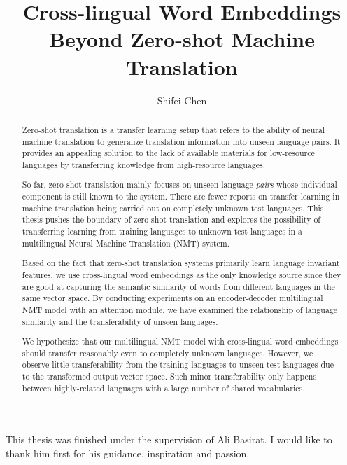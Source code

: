 \documentclass[thesis]{cluu}
\begin{document}
\author{Shifei Chen}
\title{Cross-lingual Word Embeddings Beyond Zero-shot Machine Translation}

\maketitle

\begin{abstract}
  Zero-shot translation is a transfer learning setup that refers to the ability of neural machine translation to generalize translation information into unseen language pairs. It provides an appealing solution to the lack of available materials for low-resource languages by transferring knowledge from high-resource languages.

  So far, zero-shot translation mainly focuses on unseen language \textit{pairs} whose individual component is still known to the system. There are fewer reports on transfer learning in machine translation being carried out on completely unknown test languages. This thesis pushes the boundary of zero-shot translation and explores the possibility of transferring learning from training languages to unknown test languages in a multilingual Neural Machine Translation (NMT) system.
 
  Based on the fact that zero-shot translation systems primarily learn language invariant features, we use cross-lingual word embeddings as the only knowledge source since they are good at capturing the semantic similarity of words from different languages in the same vector space. By conducting experiments on an encoder-decoder multilingual NMT model with an attention module, we have examined the relationship of language similarity and the transferability of unseen languages.
 
  We hypothesize that our multilingual NMT model with cross-lingual word embeddings should transfer reasonably even to completely unknown languages. However, we observe little transferability from the training languages to unseen test languages due to the transformed output vector space. Such minor transferability only happens between highly-related languages with a large number of shared vocabularies.
\end{abstract}

\tableofcontents


This thesis was finished under the supervision of Ali Basirat. I would like 
to thank him first for his guidance, inspiration and passion.
\end{document}
